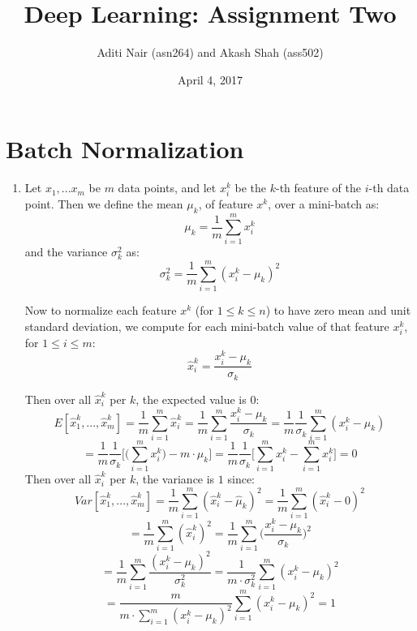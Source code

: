 \documentclass[a4paper]{article}
\title{Deep Learning: Assignment Two}
\author{Aditi Nair (asn264) and Akash Shah (ass502)}
\date{April 4, 2017}
\begin{document}
\maketitle

\section{Batch Normalization}

\begin{enumerate}
\item{Let $x_1,...x_m$ be $m$ data points, and let $x_i^k$ be the $k$-th feature of the $i$-th data point. Then we define the mean $\mu_k$, of feature $x^k$, over a mini-batch as:
$$ \mu_k = \frac{1}{m} \sum_{i=1}^m x_i^k$$
and the variance $\sigma_k^2$ as:
$$ \sigma_k^2 = \frac{1}{m} \sum_{i=1}^m (x_i^k - \mu_k)^2$$

Now to normalize each feature $x^k$ (for $ 1 \leq k \leq n$) to have zero mean and unit standard deviation, we compute for each mini-batch value of that feature $x_i^k$, for $ 1 \leq i \leq m$: 
$$\hat{x}_i^k = \frac{x_i^k - \mu_k}{\sigma_k}$$

Then over all $\hat{x}_i^k$ per $k$, the expected value is $0$:
$$E[\hat{x}_1^k,...,\hat{x}_m^k] = \frac{1}{m} \sum_{i=1}^m \hat{x}_i^k = \frac{1}{m} \sum_{i=1}^m \frac{x_i^k - \mu_k}{\sigma_k} 
= \frac{1}{m} \frac{1}{\sigma_k} \sum_{i=1}^m (x_i^k - \mu_k) $$
$$ =  \frac{1}{m} \frac{1}{\sigma_k}  \Bigg[ \Bigg( \sum_{i=1}^m x_i^k \Bigg) - m \cdot \mu_k    \Bigg]
=  \frac{1}{m} \frac{1}{\sigma_k}  \Bigg[ \sum_{i=1}^m x_i^k  - \sum_{i=1}^m x_i^k  \Bigg] = 0$$
\newline
\newline
Then over all $\hat{x}_i^k$ per $k$, the variance is $1$ since:
$$Var[\hat{x}_1^k,...,\hat{x}_m^k] = \frac{1}{m}\sum_{i=1}^m (\hat{x}_i^k - \hat{\mu}_k)^2 = \frac{1}{m}\sum_{i=1}^m (\hat{x}_i^k - 0)^2 $$
$$ = \frac{1}{m}\sum_{i=1}^m (\hat{x}_i^k)^2 
=  \frac{1}{m}\sum_{i=1}^m \Big( \frac{x_i^k- \mu_k}{\sigma_k} \Big)^2 $$
$$ = \frac{1}{m}\sum_{i=1}^m  \frac{(x_i^k - \mu_k)^2}{\sigma_k^2} = \frac{1}{m \cdot \sigma_k^2} \sum_{i=1}^m  (x_i^k - \mu_k)^2$$
$$
= \frac{m}{m \cdot \sum_{i=1}^m (x_i^k - \mu_k)^2}  \sum_{i=1}^m  (x_i^k - \mu_k)^2 = 1
$$}


\end{enumerate}
\end{document}
